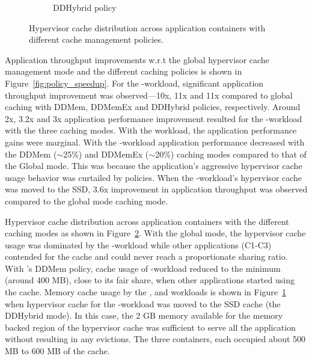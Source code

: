 \begin{figure}[t]
\begin{subfigure}{0.38\textwidth}
 \caption{DDHybrid \dd{} policy}
 \label{fig:ddhybrid} 
\vspace{-0.2cm}
\end{subfigure} 
%
\caption{Hypervisor cache distribution across application containers with
         different cache management policies.}
\vspace{-0.7cm}
\label{fig:expt2}
\end{figure}

Application throughput improvements w.r.t the global hypervisor 
cache management mode 
and the different \dd{} caching policies is shown in Figure~\ref{fig:policy_speedup}.
%
For the \web-workload, significant application throughput improvement
was observed---10x, 11x and 11x compared to global caching with
DDMem, DDMemEx and DDHybrid policies, respectively.
%
Around 2x, 3.2x and 3x application performance improvement resulted 
for the \proxy-workload with the three \dd{} caching modes.
%
With the \mail{} workload, the application performance gains were marginal.
%
With the \video-workload application performance decreased with
the DDMem ($\sim$25\%) and DDMemEx ($\sim$20\%) caching modes
compared to that of the Global mode.
%
This was because the application's aggressive hypervisor cache usage 
behavior was curtailed by \dd{} policies.
%
When the \video-workload's hypervisor cache was moved to the SSD, 
3.6x improvement in application throughput was observed
compared to the global mode caching mode.

 

Hypervisor cache distribution across application containers
with the different caching modes 
as shown in Figure~\ref{fig:expt2}.
%
With the global mode, the hypervisor cache usage was dominated by the \video-workload
while other applications (C1-C3) contended for the cache
and could never reach a proportionate sharing ratio.
%
With \dd's DDMem policy, cache usage of \video-workload reduced to 
the minimum (around 400 MB), close to its fair share,
when other applications started using the cache.
%
Memory cache usage by the \web, \proxy{} and \mail{} workloads is shown in 
Figure~\ref{fig:ddhybrid} when hypervisor cache for the \video-workload 
was moved to the SSD cache (the DDHybrid mode). 
%
In this case, the 2 GB memory available for the memory backed
region of the \dd{} hypervisor cache
was sufficient to serve all the application without resulting in 
any evictions. The three containers, each occupied about 500 MB to 600 MB
of the cache.

